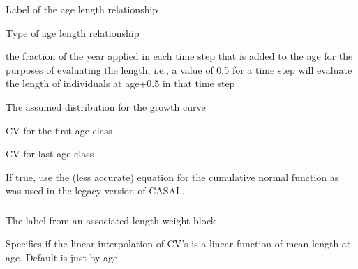
 {Label of the age length relationship}

 {Type of age length relationship}

 {the fraction of the year applied in each time step that is added to the age for the purposes of evaluating the length, i.e., a value of 0.5 for a time step will evaluate the length of individuals at age+0.5 in that time step}

 {The assumed distribution for the growth curve}

 {CV for the first age class}

 {CV for last age class}

 {If true, use the (less accurate) equation for the cumulative normal function as was used in the legacy version of CASAL.}

\subsubsection[Data]{}

 {}

 {}

 {The label from an associated length-weight block}

 {Specifies if the linear interpolation of CV's is a linear function of mean length at age. Default is just by age}

\subsubsection[None]{}

